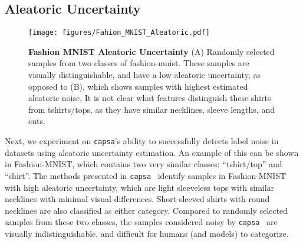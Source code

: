 \documentclass{article} %
\def\capsa{\texttt{{capsa}}}
\begin{document}
\subsection{Aleatoric Uncertainty}
\label{res:aleatoric}

\begin{wrapfigure}[22]{R}{0.4\textwidth}
\centering
\vspace{-15pt}
\texttt{[image: figures/Fahion\_MNIST\_Aleatoric.pdf]}
\vspace{-10pt}
\caption{\textbf{Fashion MNIST Aleatoric Uncertainty} (A) Randomly selected samples from two classes of fashion-mnist. These samples are visually distinguishable, and have a low aleatoric uncertainty, as opposed to (B), which shows samples with highest estimated aleatoric noise. It is not clear what features distinguish these shirts from tshirts/tops, as they have similar necklines, sleeve lengths, and cuts.}
\label{fig:fashion-mnist-aleatoric}
\vspace{-40pt}
\end{wrapfigure}


Next, we experiment on \capsa's ability to successfully detects label noise in datasets using aleatoric uncertainty estimation. An example of this can be shown in Fashion-MNIST, which contains two very similar classes: ``tshirt/top'' and ``shirt''. The methods presented in \capsa~ identify samples in Fashion-MNIST with high aleatoric uncertainty, which are light sleeveless tops with similar necklines with minimal visual differences. Short-sleeved shirts with round necklines are also classified as either category. Compared to randomly selected samples from these two classes, the samples considered noisy by \capsa~ are visually indistinguishable, and difficult for humans (and models) to categorize. 
\end{document}
